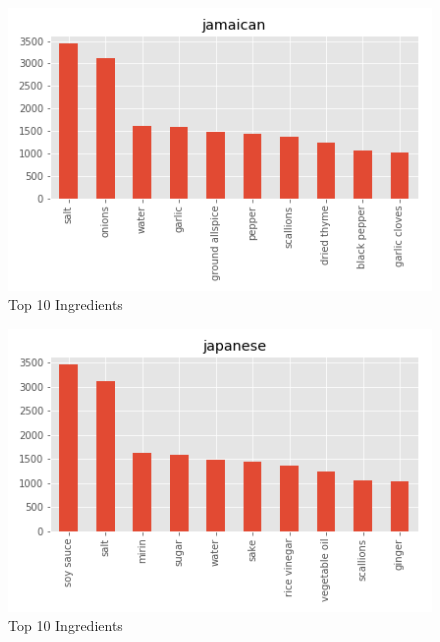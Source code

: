 \documentclass[sigconf]{acmart}
\begin{document}
\begin{figure}[!ht]
  \centering\includegraphics[width=\columnwidth]{images/jamaican_10_most_used_ingredients.png}
  \caption{Top 10 Ingredients }\label{f:jamaican_10_most_used_ingredients}
\end{figure}

\begin{figure}[!ht]
  \centering\includegraphics[width=\columnwidth]{images/japanese_10_most_used_ingredients.png}
  \caption{Top 10 Ingredients }\label{f:japanese_10_most_used_ingredients}
\end{figure}
\end{document}
